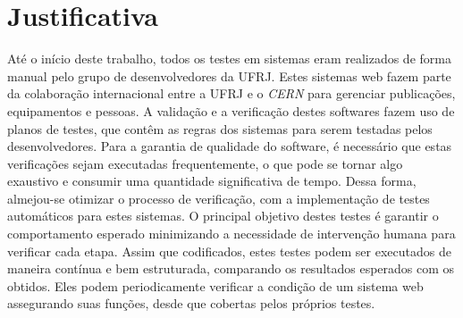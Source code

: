 \section{Justificativa}

Até o início deste trabalho, todos os testes em sistemas eram realizados de forma manual pelo grupo de desenvolvedores da UFRJ. Estes sistemas web fazem parte da colaboração internacional entre a UFRJ e o \emph{CERN} para gerenciar publicações, equipamentos e pessoas. A validação e a verificação destes softwares fazem uso de planos de testes, que contêm as regras dos sistemas para serem testadas pelos desenvolvedores. Para a garantia de qualidade do software, é necessário que estas verificações sejam executadas frequentemente, o que pode se tornar algo exaustivo e consumir uma quantidade significativa de tempo. Dessa forma, almejou-se otimizar o processo de verificação, com a implementação de testes automáticos para estes sistemas. O principal objetivo destes testes é garantir o comportamento esperado minimizando a necessidade de intervenção humana para verificar cada etapa. Assim que codificados, estes testes podem ser executados de maneira contínua e bem estruturada, comparando os resultados esperados com os obtidos. Eles podem periodicamente verificar a condição de um sistema web assegurando suas funções, desde que cobertas pelos próprios testes.